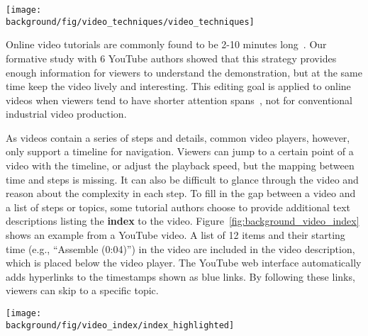 \begin{figure*}[!t]
  \centering
  \texttt{[image: \\background/fig/video\_techniques/video\_techniques]}
  \begin{minipage}{\textwidth}
  \caption[Example video editing techniques used in a video tutorial.]{
    Example video editing techniques used in a video tutorial\footnote{``How to use Loola 3 stroller'' by Maxi-Cosi, \url{https://youtu.be/p6MzLXeWBJw}, licensed under CC BY 2.0}:
    (a) a sequence of overview and detailed shots, and
    (b) a title scene to introduce a new section, which can include animation or movement as a preview.
  }
  \label{fig:background_video_techniques}
  \end{minipage}
\end{figure*}


Online video tutorials are commonly found to be 2-10 minutes long~\cite{Chi:2013:DGC:2501988.2502052}. Our formative study with 6 YouTube authors showed that this strategy provides enough information for viewers to understand the demonstration, but at the same time keep the video lively and interesting. This editing goal is applied to online videos when viewers tend to have shorter attention spans~\cite{YouTubeVideoLength2016,YouTubeVideoLength2012}, not for conventional industrial video production.

As videos contain a series of steps and details, common video players, however, only support a timeline for navigation. Viewers can jump to a certain point of a video with the timeline, or adjust the playback speed, but the mapping between time and steps is missing. It can also be difficult to glance through the video and reason about the complexity in each step.
%
To fill in the gap between a video and a list of steps or topics, some tutorial authors choose to provide additional text descriptions listing the \textbf{index} to the video. Figure~\ref{fig:background_video_index} shows an example from a YouTube video. A list of 12 items and their starting time (e.g., ``Assemble (0:04)'') in the video are included in the video description, which is placed below the video player. The YouTube web interface automatically adds hyperlinks to the timestamps shown as blue links. By following these links, viewers can skip to a specific topic.

\begin{figure*}[h!]
  \centering
  \texttt{[image: \\background/fig/video\_index/index\_highlighted]}
  \begin{minipage}{\textwidth}
  \caption[Example video index to video instructions provided by authors for viewers to navigate between topics.]{
    Example video index to video instructions\footnote{Mountain Buggy, Urban Jungle ™ Stroller Instructions, \url{https://youtu.be/QwCtdpDmYu8}} provided by authors for viewers to navigate between topics.
  }
  \label{fig:background_video_index}
  \end{minipage}
\end{figure*}

